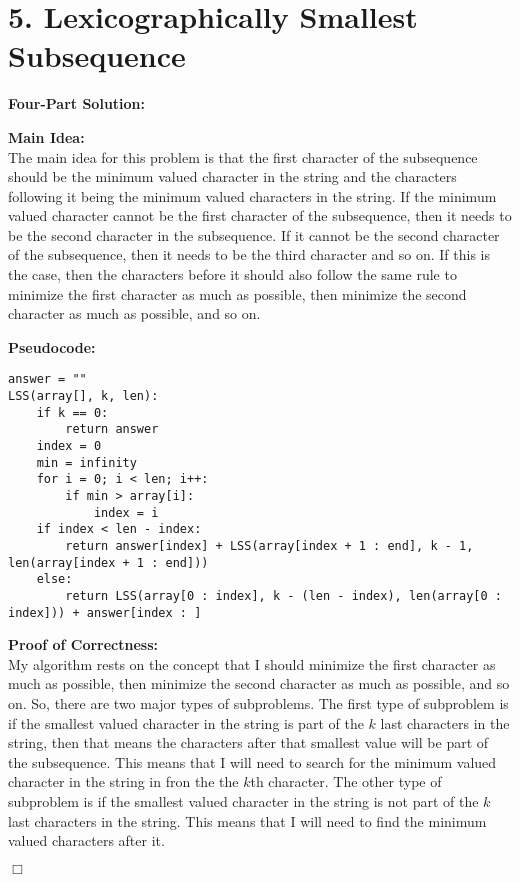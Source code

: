 \documentclass[11pt]{article}
\def\endproofmark{$\Box$}
\newenvironment{FourPartSolution}{\par{\bf Four-Part Solution:}}{\smallskip}
\newenvironment{mainIdea}{\par{\bf Main Idea:}}{\smallskip}
\newenvironment{pseudocode}{\par{\bf Pseudocode:}}{\smallskip}
\newenvironment{proofOfCorrectness}{\par{\bf Proof of Correctness:}}{\endproofmark\smallskip}
\begin{document}
\section*{5. Lexicographically Smallest Subsequence}
\begin{FourPartSolution}
\\
\begin{mainIdea}
\\
The main idea for this problem is that the first character of the subsequence should be the minimum valued character in the string and the characters following it being the minimum valued characters in the string. If the minimum valued character cannot be the first character of the subsequence, then it needs to be the second character in the subsequence. If it cannot be the second character of the subsequence, then it needs to be the third character and so on. If this is the case, then the characters before it should also follow the same rule to minimize the first character as much as possible, then minimize the second character as much as possible, and so on.
\end{mainIdea}
\\
\begin{pseudocode}
\begin{lstlisting}
answer = ""
LSS(array[], k, len):
	if k == 0:
		return answer
	index = 0
	min = infinity
	for i = 0; i < len; i++:
		if min > array[i]:
			index = i
	if index < len - index:
		return answer[index] + LSS(array[index + 1 : end], k - 1, len(array[index + 1 : end]))
	else:
		return LSS(array[0 : index], k - (len - index), len(array[0 : index])) + answer[index : ]
\end{lstlisting}
\end{pseudocode}
\begin{proofOfCorrectness}
\\
My algorithm rests on the concept that I should minimize the first character as much as possible, then minimize the second character as much as possible, and so on. So, there are two major types of subproblems. The first type of subproblem is if the smallest valued character in the string is part of the $k$ last characters in the string, then that means the characters after that smallest value will be part of the subsequence. This means that I will need to search for the minimum valued character in the string in fron the the $k$th character. The other type of subproblem is if the smallest valued character in the string is not part of the $k$ last characters in the string. This means that I will need to find the minimum valued characters after it.

\end{proofOfCorrectness}
\end{FourPartSolution}
\end{document}

